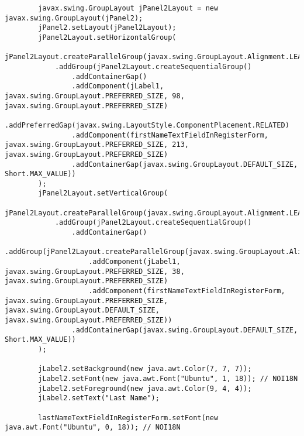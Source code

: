 \documentclass[12pt,a4paper]{article}
\begin{document}
\begin{lstlisting}
        javax.swing.GroupLayout jPanel2Layout = new javax.swing.GroupLayout(jPanel2);
        jPanel2.setLayout(jPanel2Layout);
        jPanel2Layout.setHorizontalGroup(
            jPanel2Layout.createParallelGroup(javax.swing.GroupLayout.Alignment.LEADING)
            .addGroup(jPanel2Layout.createSequentialGroup()
                .addContainerGap()
                .addComponent(jLabel1, javax.swing.GroupLayout.PREFERRED_SIZE, 98, javax.swing.GroupLayout.PREFERRED_SIZE)
                .addPreferredGap(javax.swing.LayoutStyle.ComponentPlacement.RELATED)
                .addComponent(firstNameTextFieldInRegisterForm, javax.swing.GroupLayout.PREFERRED_SIZE, 213, javax.swing.GroupLayout.PREFERRED_SIZE)
                .addContainerGap(javax.swing.GroupLayout.DEFAULT_SIZE, Short.MAX_VALUE))
        );
        jPanel2Layout.setVerticalGroup(
            jPanel2Layout.createParallelGroup(javax.swing.GroupLayout.Alignment.LEADING)
            .addGroup(jPanel2Layout.createSequentialGroup()
                .addContainerGap()
                .addGroup(jPanel2Layout.createParallelGroup(javax.swing.GroupLayout.Alignment.BASELINE)
                    .addComponent(jLabel1, javax.swing.GroupLayout.PREFERRED_SIZE, 38, javax.swing.GroupLayout.PREFERRED_SIZE)
                    .addComponent(firstNameTextFieldInRegisterForm, javax.swing.GroupLayout.PREFERRED_SIZE, javax.swing.GroupLayout.DEFAULT_SIZE, javax.swing.GroupLayout.PREFERRED_SIZE))
                .addContainerGap(javax.swing.GroupLayout.DEFAULT_SIZE, Short.MAX_VALUE))
        );

        jLabel2.setBackground(new java.awt.Color(7, 7, 7));
        jLabel2.setFont(new java.awt.Font("Ubuntu", 1, 18)); // NOI18N
        jLabel2.setForeground(new java.awt.Color(9, 4, 4));
        jLabel2.setText("Last Name");

        lastNameTextFieldInRegisterForm.setFont(new java.awt.Font("Ubuntu", 0, 18)); // NOI18N


\end{lstlisting}
\end{document}
